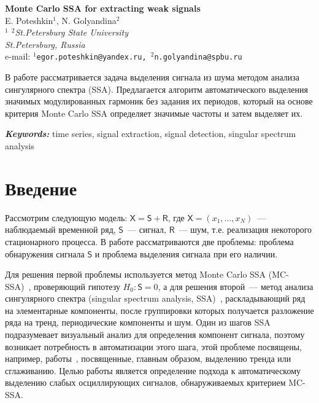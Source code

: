\documentclass[12pt]{article}
\providecommand{\keywords}[1]
{
\vspace{2mm}\hspace{20pt}\textbf{\textit{Keywords:}} #1
}
\providecommand{\abskeyw}[2]
{
\begin{small}
\begin{adjustwidth}{10mm}{10mm}
\vspace{1mm}\hspace{20pt}#1

\keywords{#2}
\end{adjustwidth}
\end{small}
}
\begin{document}
\begin{center}
{\Large\bf Monte Carlo SSA for extracting weak signals}\\\vspace{2mm} {\sc E. Poteshkin$^1$, N. Golyandina$^2$}\\\vspace{2mm}
{\it $^{1}$ $^{2}$St.Petersburg State University\\
St.Petersburg, Russia\\} e-mail: {\tt $^1$egor.poteshkin@yandex.ru,
$^2$n.golyandina@spbu.ru}

\abskeyw{В работе рассматривается задача выделения сигнала из шума методом анализа сингулярного спектра (SSA). Предлагается алгоритм автоматического выделения значимых модулированных гармоник без задания их периодов, который на основе критерия Monte Carlo SSA определяет значимые частоты и затем выделяет их.}{time series, signal extraction, signal detection, singular spectrum analysis}
\end{center}

\section{Введение}

Рассмотрим следующую модель: $\mathsf{X}=\mathsf{S}+\mathsf{R}$, где $\mathsf{X} = (x_1,\ldots,x_N)$~--- наблюдаемый временной ряд, $\mathsf{S}$~--- сигнал, $\mathsf{R}$~--- шум, т.е. реализация некоторого стационарного процесса. В работе рассматриваются две проблемы: проблема обнаружения сигнала $\mathsf{S}$ и проблема выделения сигнала при его наличии.

Для решения первой проблемы используется метод Monte Carlo SSA (MC-SSA)~\cite{AllenSmith96}, проверяющий гипотезу $H_0:\mathsf{S}=0$, а для решения второй~--- метод анализа сингулярного спектра (singular spectrum analysis, SSA)~\cite{Broomhead1986, ssa2001}, раскладывающий ряд на элементарные компоненты, после группировки которых получается разложение ряда на тренд, периодические компоненты и шум. Один из шагов SSA подразумевает визуальный анализ для определения компонент сигнала, поэтому возникает потребность в автоматизации этого шага, этой проблеме посвящены, например, работы~\cite{alexandrov, Kalantari2019, circSSA, autoSSA}, посвященные, главным образом, выделению тренда или сглаживанию. Целью работы является определение подхода к автоматическому выделению слабых осциллирующих сигналов, обнаруживаемых критерием MC-SSA.
\end{document}

